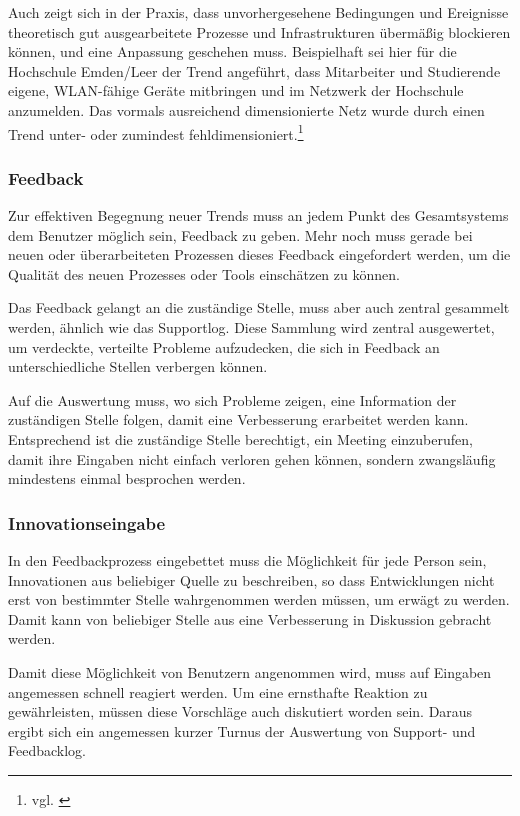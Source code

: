 Auch zeigt sich in der Praxis, dass unvorhergesehene Bedingungen und Ereignisse theoretisch gut ausgearbeitete Prozesse und Infrastrukturen übermäßig blockieren können, und eine Anpassung geschehen muss. Beispielhaft sei hier für die Hochschule Emden/Leer der Trend angeführt, dass Mitarbeiter und Studierende eigene, WLAN-fähige Geräte mitbringen und im Netzwerk der Hochschule anzumelden. Das vormals ausreichend dimensionierte Netz wurde durch einen Trend unter- oder zumindest fehldimensioniert.\footnote{vgl. \cite{gunter_muller_interview}}

\subsubsection{Feedback}
Zur effektiven Begegnung neuer Trends muss an jedem Punkt des Gesamtsystems dem Benutzer möglich sein, Feedback zu geben. Mehr noch muss gerade bei neuen oder überarbeiteten Prozessen dieses Feedback eingefordert werden, um die Qualität des neuen Prozesses oder Tools einschätzen zu können.

Das Feedback gelangt an die zuständige Stelle, muss aber auch zentral gesammelt werden, ähnlich wie das Supportlog. Diese Sammlung wird zentral ausgewertet, um verdeckte, verteilte Probleme aufzudecken, die sich in Feedback an unterschiedliche Stellen verbergen können.

Auf die Auswertung muss, wo sich Probleme zeigen, eine Information der zuständigen Stelle folgen, damit eine Verbesserung erarbeitet werden kann. Entsprechend ist die zuständige Stelle berechtigt, ein Meeting einzuberufen, damit ihre Eingaben nicht einfach verloren gehen können, sondern zwangsläufig mindestens einmal besprochen werden.

\subsubsection{Innovationseingabe}
In den Feedbackprozess eingebettet muss die Möglichkeit für jede Person sein, Innovationen aus beliebiger Quelle zu beschreiben, so dass Entwicklungen nicht erst von bestimmter Stelle wahrgenommen werden müssen, um erwägt zu werden. Damit kann von beliebiger Stelle aus eine Verbesserung in Diskussion gebracht werden.

Damit diese Möglichkeit von Benutzern angenommen wird, muss auf Eingaben angemessen schnell reagiert werden. Um eine ernsthafte Reaktion zu gewährleisten, müssen diese Vorschläge auch diskutiert worden sein. Daraus ergibt sich ein angemessen kurzer Turnus der Auswertung von Support- und Feedbacklog.

